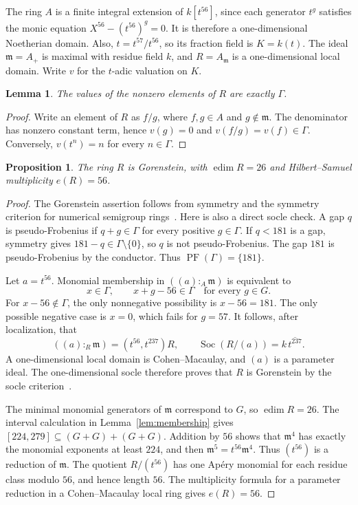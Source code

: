 \documentclass[11pt,letterpaper]{article}
\newtheorem{proposition}[theorem]{Proposition}
\newtheorem{lemma}[theorem]{Lemma}
\theoremstyle{remark}
\newcommand{\m}{\mathfrak m}
\newcommand{\Soc}{\operatorname{Soc}}
\newcommand{\PF}{\operatorname{PF}}
\newcommand{\edim}{\operatorname{edim}}
\numberwithin{equation}{section}
\begin{document}
The ring $A$ is a finite integral extension of $k[t^{56}]$, since each generator $t^g$ satisfies the monic equation $X^{56}-(t^{56})^g=0$. It is therefore a one-dimensional Noetherian domain. Also, $t=t^{57}/t^{56}$, so its fraction field is $K=k(t)$. The ideal $\m=A_+$ is maximal with residue field $k$, and $R=A_\m$ is a one-dimensional local domain. Write $v$ for the $t$-adic valuation on $K$.

\begin{lemma}\label{lem:valuation}
The values of the nonzero elements of $R$ are exactly $\Gamma$.
\end{lemma}
\begin{proof}
Write an element of $R$ as $f/g$, where $f,g\in A$ and $g\notin\m$. The denominator has nonzero constant term, hence $v(g)=0$ and $v(f/g)=v(f)\in\Gamma$. Conversely, $v(t^n)=n$ for every $n\in\Gamma$.
\end{proof}

\begin{proposition}\label{prop:Gorenstein}
The ring $R$ is Gorenstein, with $\edim R=26$ and Hilbert--Samuel multiplicity $e(R)=56$.
\end{proposition}
\begin{proof}
The Gorenstein assertion follows from symmetry and the symmetry criterion for numerical semigroup rings~\cite{Kunz}. Here is also a direct socle check. A gap $q$ is pseudo-Frobenius if $q+g\in\Gamma$ for every positive $g\in\Gamma$. If $q<181$ is a gap, symmetry gives $181-q\in\Gamma\setminus\{0\}$, so $q$ is not pseudo-Frobenius. The gap $181$ is pseudo-Frobenius by the conductor. Thus $\PF(\Gamma)=\{181\}$.

Let $a=t^{56}$. Monomial membership in $((a):_A\m)$ is equivalent to
\[
 x\in\Gamma,\qquad x+g-56\in\Gamma\quad\text{for every }g\in G.
\]
For $x-56\notin\Gamma$, the only nonnegative possibility is $x-56=181$. The only possible negative case is $x=0$, which fails for $g=57$. It follows, after localization, that
\[
 ((a):_R\m)=(t^{56},t^{237})R,\qquad
 \Soc(R/(a))=k\,\overline{t^{237}}.
\]
A one-dimensional local domain is Cohen--Macaulay, and $(a)$ is a parameter ideal. The one-dimensional socle therefore proves that $R$ is Gorenstein by the socle criterion~\cite[Theorem~18.1]{Matsumura}.

The minimal monomial generators of $\m$ correspond to $G$, so $\edim R=26$. The interval calculation in Lemma~\ref{lem:membership} gives $[224,279]\subseteq(G+G)+(G+G)$. Addition by $56$ shows that $\m^4$ has exactly the monomial exponents at least $224$, and then $\m^5=t^{56}\m^4$. Thus $(t^{56})$ is a reduction of $\m$. The quotient $R/(t^{56})$ has one Ap\'ery monomial for each residue class modulo $56$, and hence length $56$. The multiplicity formula for a parameter reduction in a Cohen--Macaulay local ring gives $e(R)=56$.
\end{proof}
\end{document}

